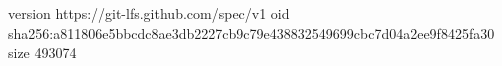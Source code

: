 version https://git-lfs.github.com/spec/v1
oid sha256:a811806e5bbcdc8ae3db2227cb9c79e438832549699cbc7d04a2ee9f8425fa30
size 493074

